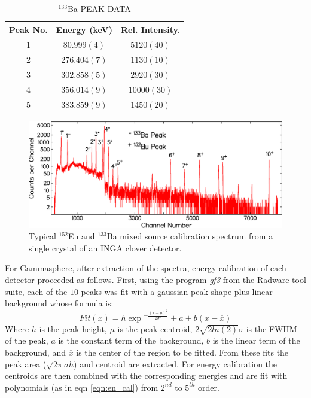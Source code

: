 \begin{table}
\caption{$^{133}$Ba PEAK DATA \label{tbl:133Ba-peaks}}
\begin{center}
\begin{tabular}{ccc}
\toprule
Peak No. & Energy (keV) & Rel. Intensity. \\ 
\midrule
1 & $80.999(4)$ & $5120(40)$ \\ 
2 & $276.404(7)$ & $1130(10)$ \\ 
3 & $302.858(5)$ & $2920(30)$ \\ 
4 & $356.014(9)$ & $10000(30)$ \\ 
5 & $383.859(9)$ & $1450(20)$ \\ 
\bottomrule
\end{tabular} 
\end{center}
\end{table}
\begin{figure}[h!]
	\centerline{\includegraphics[height=0.25\textheight]{./img/c3/inga_crystal_en_cal.eps}}
	\caption{Typical $^{152}$Eu and $^{133}$Ba mixed source calibration spectrum from a single crystal of an INGA clover detector.}
	\label{fig:chp3-inga-cal-spec}
\end{figure}
For Gammasphere, after extraction of the spectra, energy calibration of each detector proceeded as follows. First, using the program \emph{gf3} from the Radware tool suite\cite{radware}, each of the $10$ peaks was fit with a gaussian peak shape plus linear background whose formula is:
\begin{equation}
\label{eqn:pk_fit} 
Fit(x) = h\exp{}^{-\frac{(x-\mu{})^2}{2\sigma{}^2}} + a + b (x-\overline{x})
\end{equation}
 Where $h$ is the peak height, $\mu{}$ is the peak centroid, $2\sqrt{2ln(2)}\sigma{}$ is the FWHM of the peak, $a$ is the constant term of the background, $b$ is the linear term of the background, and $\overline{x}$ is the center of the region to be fitted. From these fits the peak area ($\sqrt{2\pi{}}\sigma{}h$) and centroid are extracted. For energy calibration the centroids are then combined with the corresponding energies and are fit with polynomials (as in eqn \ref{eqn:en_cal}) from $2^{nd}$ to $5^{th}$ order.


